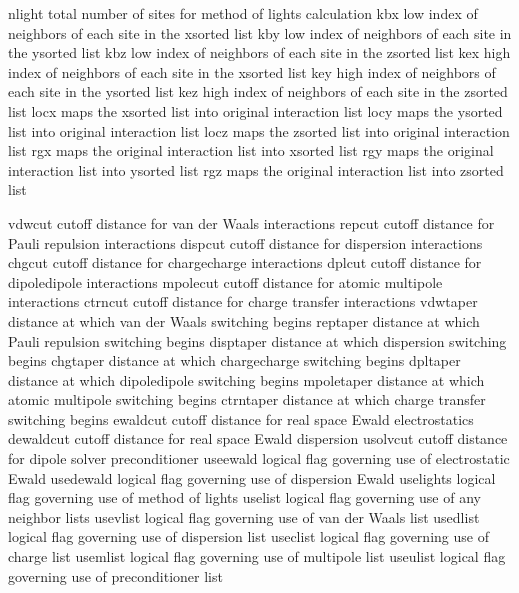 \documentclass[letterpaper,11pt,english]{sphinxmanual}
\begin{document}
\begin{sphinxVerbatim}[commandchars=\\\{\}]
nlight          total number of sites for method of lights calculation
kbx             low index of neighbors of each site in the x\PYGZhy{}sorted list
kby             low index of neighbors of each site in the y\PYGZhy{}sorted list
kbz             low index of neighbors of each site in the z\PYGZhy{}sorted list
kex             high index of neighbors of each site in the x\PYGZhy{}sorted list
key             high index of neighbors of each site in the y\PYGZhy{}sorted list
kez             high index of neighbors of each site in the z\PYGZhy{}sorted list
locx            maps the x\PYGZhy{}sorted list into original interaction list
locy            maps the y\PYGZhy{}sorted list into original interaction list
locz            maps the z\PYGZhy{}sorted list into original interaction list
rgx             maps the original interaction list into x\PYGZhy{}sorted list
rgy             maps the original interaction list into y\PYGZhy{}sorted list
rgz             maps the original interaction list into z\PYGZhy{}sorted list
\end{sphinxVerbatim}

\sphinxAtStartPar
{}

\begin{sphinxVerbatim}[commandchars=\\\{\}]
vdwcut          cutoff distance for van der Waals interactions
repcut          cutoff distance for Pauli repulsion interactions
dispcut         cutoff distance for dispersion interactions
chgcut          cutoff distance for charge\PYGZhy{}charge interactions
dplcut          cutoff distance for dipole\PYGZhy{}dipole interactions
mpolecut        cutoff distance for atomic multipole interactions
ctrncut         cutoff distance for charge transfer interactions
vdwtaper        distance at which van der Waals switching begins
reptaper        distance at which Pauli repulsion switching begins
disptaper       distance at which dispersion switching begins
chgtaper        distance at which charge\PYGZhy{}charge switching begins
dpltaper        distance at which dipole\PYGZhy{}dipole switching begins
mpoletaper      distance at which atomic multipole switching begins
ctrntaper       distance at which charge transfer switching begins
ewaldcut        cutoff distance for real space Ewald electrostatics
dewaldcut       cutoff distance for real space Ewald dispersion
usolvcut        cutoff distance for dipole solver preconditioner
use\PYGZus{}ewald       logical flag governing use of electrostatic Ewald
use\PYGZus{}dewald      logical flag governing use of dispersion Ewald
use\PYGZus{}lights      logical flag governing use of method of lights
use\PYGZus{}list        logical flag governing use of any neighbor lists
use\PYGZus{}vlist       logical flag governing use of van der Waals list
use\PYGZus{}dlist       logical flag governing use of dispersion list
use\PYGZus{}clist       logical flag governing use of charge list
use\PYGZus{}mlist       logical flag governing use of multipole list
use\PYGZus{}ulist       logical flag governing use of preconditioner list
\end{sphinxVerbatim}
\end{document}
